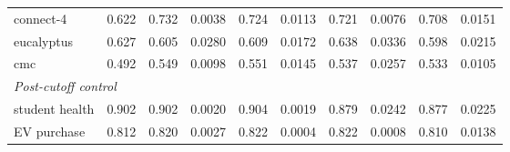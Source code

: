 \begin{table}[htbp]
\begin{tabular}{lrrrrrrrrr}
    connect-4 & 0.622 & 0.732 & 0.0038 & 0.724 & 0.0113 & 0.721 & 0.0076 & 0.708 & 0.0151 \\
    eucalyptus & 0.627 & 0.605 & 0.0280 & 0.609 & 0.0172 & 0.638 & 0.0336 & 0.598 & 0.0215 \\
    cmc & 0.492 & 0.549 & 0.0098 & 0.551 & 0.0145 & 0.537 & 0.0257 & 0.533 & 0.0105 \\
    \midrule
    \multicolumn{10}{l}{\emph{Post-cutoff control}} \\
    student health & 0.902 & 0.902 & 0.0020 & 0.904 & 0.0019 & 0.879 & 0.0242 & 0.877 & 0.0225 \\
    EV purchase & 0.812 & 0.820 & 0.0027 & 0.822 & 0.0004 & 0.822 & 0.0008 & 0.810 & 0.0138 \\
    \bottomrule
  \end{tabular}
\end{table}
